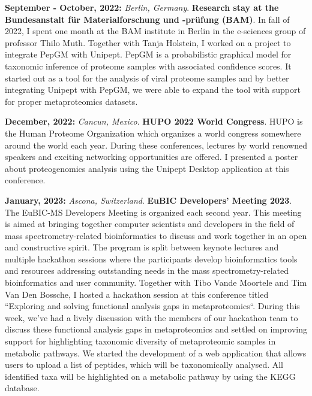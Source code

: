 \textbf{September - October, 2022:} \textit{Berlin, Germany}. \textbf{Research stay at the Bundesanstalt für Materialforschung und -prüfung (BAM)}. In fall of 2022, I spent one month at the BAM institute in Berlin in the e-sciences group of professor Thilo Muth.
Together with Tanja Holstein, I worked on a project to integrate PepGM with Unipept.
PepGM is a probabilistic graphical model for taxonomic inference of proteome samples with associated confidence scores.
It started out as a tool for the analysis of viral proteome samples and by better integrating Unipept with PepGM, we were able to expand the tool with support for proper metaproteomics datasets.

\textbf{December, 2022:} \textit{Cancun, Mexico}. \textbf{HUPO 2022 World Congress}. HUPO is the Human Proteome Organization which organizes a world congress somewhere around the world each year.
During these conferences, lectures by world renowned speakers and exciting networking opportunities are offered.
I presented a poster about proteogenomics analysis using the Unipept Desktop application at this conference.

\textbf{January, 2023:} \textit{Ascona, Switzerland}. \textbf{EuBIC Developers' Meeting 2023}. The EuBIC-MS Developers Meeting is organized each second year.
This meeting is aimed at bringing together computer scientists and developers in the field of mass spectrometry-related bioinformatics to discuss and work together in an open and constructive spirit.
The program is split between keynote lectures and multiple hackathon sessions where the participants develop bioinformatics tools and resources addressing outstanding needs in the mass spectrometry-related bioinformatics and user community.
Together with Tibo Vande Moortele and Tim Van Den Bossche, I hosted a hackathon session at this conference titled ``Exploring and solving functional analysis gaps in metaproteomics``.
During this week, we've had a lively discussion with the members of our hackathon team to discuss these functional analysis gaps in metaproteomics and settled on improving support for highlighting taxonomic diversity of metaproteomic samples in metabolic pathways.
We started the development of a web application that allows users to upload a list of peptides, which will be taxonomically analysed.
All identified taxa will be highlighted on a metabolic pathway by using the KEGG database.
